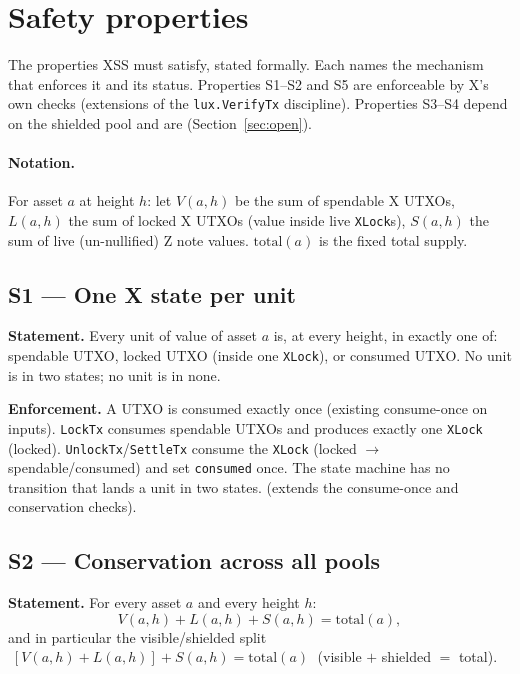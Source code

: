 \section{Safety properties}
\label{sec:safety}

The properties XSS must satisfy, stated formally. Each names the
mechanism that enforces it and its status. Properties S1--S2 and S5 are
enforceable by X's own checks (extensions of the \IMPL{}
\texttt{lux.VerifyTx} discipline). Properties S3--S4 depend on the
shielded pool and are \CRYPTO{} (Section~\ref{sec:open}).

\paragraph{Notation.} For asset $a$ at height $h$: let $V(a,h)$ be the
sum of spendable X UTXOs, $L(a,h)$ the sum of locked X UTXOs (value
inside live \texttt{XLock}s), $S(a,h)$ the sum of live (un-nullified) Z
note values. $\mathrm{total}(a)$ is the fixed total supply.

\subsection*{S1 --- One X state per unit}

\textbf{Statement.} Every unit of value of asset $a$ is, at every height,
in exactly one of: spendable UTXO, locked UTXO (inside one \texttt{XLock}),
or consumed UTXO. No unit is in two states; no unit is in none.

\textbf{Enforcement.} A UTXO is consumed exactly once (existing
consume-once on inputs). \texttt{LockTx} consumes spendable UTXOs and
produces exactly one \texttt{XLock} (locked). \texttt{UnlockTx}/\texttt{SettleTx}
consume the \texttt{XLock} (locked $\to$ spendable/consumed) and set
\texttt{consumed} once. The state machine has no transition that lands a
unit in two states. \DESIGN{} (extends the \IMPL{} consume-once and
conservation checks).

\subsection*{S2 --- Conservation across all pools}

\textbf{Statement.} For every asset $a$ and every height $h$:
\[
  V(a,h) + L(a,h) + S(a,h) = \mathrm{total}(a),
\]
and in particular the visible/shielded split
$\;[V(a,h)+L(a,h)] + S(a,h) = \mathrm{total}(a)\;$
(visible $+$ shielded $=$ total).

